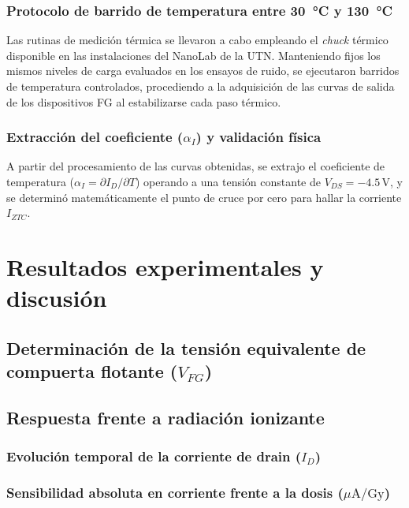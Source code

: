 \documentclass[12pt,a4paper,oneside]{book}
\begin{document}
\subsection[Barrido de temperatura entre 30 °C y 130 °C]{Protocolo de barrido de temperatura entre \texorpdfstring{30~°C y 130~°C}{30 °C y 130 °C}}
Las rutinas de medición térmica se llevaron a cabo empleando el \textit{chuck} térmico disponible en las instalaciones del NanoLab de la UTN. Manteniendo fijos los mismos niveles de carga evaluados en los ensayos de ruido, se ejecutaron barridos de temperatura controlados, procediendo a la adquisición de las curvas de salida de los dispositivos FG al estabilizarse cada paso térmico.

\subsection{Extracción del coeficiente \texorpdfstring{($\alpha_I$)}{(α)} y validación física}
A partir del procesamiento de las curvas obtenidas, se extrajo el coeficiente de temperatura ($\alpha_I = \partial I_D / \partial T$) operando a una tensión constante de $V_{DS} = -4.5$\,V, y se determinó matemáticamente el punto de cruce por cero para hallar la corriente $I_{ZTC}$.


\chapter{Resultados experimentales y discusión}

\section{Determinación de la tensión equivalente de compuerta flotante \texorpdfstring{($V_{FG}$)}{(VFG)}}

\section{Respuesta frente a radiación ionizante}
\subsection{Evolución temporal de la corriente de drain \texorpdfstring{($I_D$)}{(ID)}}
\subsection[Sensibilidad absoluta en corriente frente a la dosis]{Sensibilidad absoluta en corriente frente a la dosis \texorpdfstring{($\mu\text{A/Gy}$)}{(uA/Gy)}}
\end{document}
